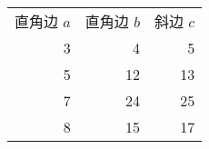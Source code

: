 \begin{tabular}{rrr}
\rowcolor{craneorange}直角边 $a$ & 直角边 $b$ & 斜边 $c$\\
3 & 4 & 5 \\
5 & 12 & 13 \\
7 & 24 & 25 \\
8 & 15 & 17 \\
\end{tabular}

